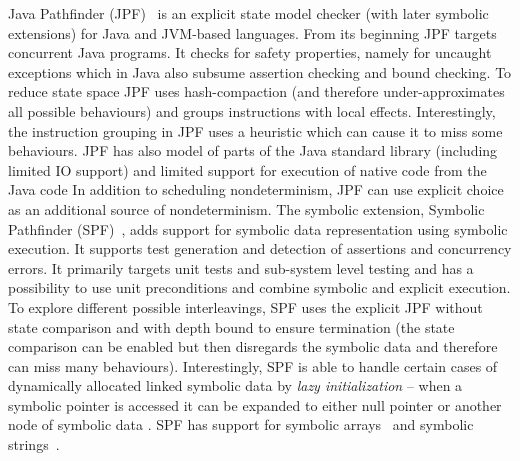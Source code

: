 Java Pathfinder (JPF)~\cite{Artho2019,Visser2003} is an explicit state model
checker (with later symbolic extensions) for Java and JVM-based
languages.
From its beginning JPF targets concurrent Java programs.
It checks for safety properties, namely for uncaught exceptions which in Java also subsume assertion checking and bound checking.
To reduce state space JPF uses hash-compaction (and therefore under-approximates all possible behaviours) and groups instructions with local effects.
Interestingly, the instruction grouping in JPF uses a heuristic which can cause it to miss some behaviours.
JPF has also model of parts of the Java standard library (including limited IO
support) and limited support for execution of native code from the Java
code
In addition to scheduling nondeterminism, JPF can use explicit choice as an
additional source of nondeterminism.
The symbolic extension, Symbolic Pathfinder (SPF)~\cite{Pasareanu2013}, \cite{Noller2019} adds
support for symbolic data representation using symbolic execution.
It supports test generation and detection of assertions and concurrency errors.
It primarily targets unit tests and sub-system level testing and has a
possibility to use unit preconditions and combine symbolic and explicit
execution.
To explore different possible interleavings, SPF uses the explicit JPF without
state comparison and with depth bound to ensure termination (the state
comparison can be enabled but then disregards the symbolic data and therefore
can miss many behaviours).
Interestingly, SPF is able to handle certain cases of dynamically allocated
linked symbolic data by \emph{lazy initialization} -- when a symbolic pointer
is accessed it can be expanded to either null pointer or another node of
symbolic data \cite{Khurshid2003}.
SPF has support for symbolic arrays~\cite{Fromherz2017} and symbolic strings~\cite{Bang2016}.

